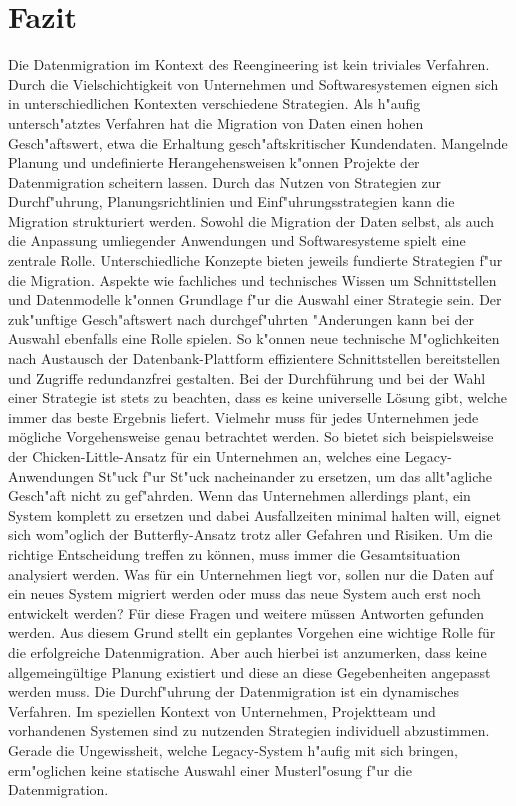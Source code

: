 \section{Fazit}
\label{chapter:fazit}

Die Datenmigration im Kontext des Reengineering ist kein triviales Verfahren. Durch die Vielschichtigkeit von Unternehmen und Softwaresystemen eignen sich in unterschiedlichen Kontexten verschiedene Strategien. Als h"aufig untersch"atztes Verfahren hat die Migration von Daten einen hohen Gesch"aftswert, etwa die Erhaltung gesch"aftskritischer Kundendaten. Mangelnde Planung und undefinierte Herangehensweisen k"onnen Projekte der Datenmigration scheitern lassen. Durch das Nutzen von Strategien zur Durchf"uhrung, Planungsrichtlinien und Einf"uhrungsstrategien kann die Migration strukturiert werden.
\lb
Sowohl die Migration der Daten selbst, als auch die Anpassung umliegender Anwendungen und Softwaresysteme spielt eine zentrale Rolle. Unterschiedliche Konzepte bieten jeweils fundierte Strategien f"ur die Migration. Aspekte wie fachliches und technisches Wissen um Schnittstellen und Datenmodelle k"onnen Grundlage f"ur die Auswahl einer Strategie sein. Der zuk"unftige Gesch"aftswert nach durchgef"uhrten "Anderungen kann bei der Auswahl ebenfalls eine Rolle spielen. So k"onnen neue technische M"oglichkeiten nach Austausch der Datenbank-Plattform effizientere Schnittstellen bereitstellen und Zugriffe redundanzfrei gestalten.
\lb
Bei der Durchführung und bei der Wahl einer Strategie ist stets zu beachten, dass es keine universelle Lösung gibt, welche immer das beste Ergebnis liefert. Vielmehr muss für jedes Unternehmen jede mögliche Vorgehensweise genau betrachtet werden. So bietet sich beispielsweise der Chicken-Little-Ansatz für ein Unternehmen an, welches eine Legacy-Anwendungen St"uck f"ur St"uck nacheinander zu ersetzen, um das allt"agliche Gesch"aft nicht zu gef"ahrden. Wenn das Unternehmen allerdings plant, ein System komplett zu ersetzen und dabei Ausfallzeiten minimal halten will, eignet sich wom"oglich der Butterfly-Ansatz trotz aller Gefahren und Risiken. 
\lb
Um die richtige Entscheidung treffen zu können, muss immer die Gesamtsituation analysiert werden. Was für ein Unternehmen liegt vor, sollen nur die Daten auf ein neues System migriert werden oder muss das neue System auch erst noch entwickelt werden? Für diese Fragen und weitere müssen Antworten gefunden werden. Aus diesem Grund stellt ein geplantes Vorgehen eine wichtige Rolle für die erfolgreiche Datenmigration. Aber auch hierbei ist anzumerken, dass keine allgemeingültige Planung existiert und diese an diese Gegebenheiten angepasst werden muss. 
\lb
Die Durchf"uhrung der Datenmigration ist ein dynamisches Verfahren. Im speziellen Kontext von Unternehmen, Projektteam und vorhandenen Systemen sind zu nutzenden Strategien individuell abzustimmen. Gerade die Ungewissheit, welche Legacy-System h"aufig mit sich bringen, erm"oglichen keine statische Auswahl einer Musterl"osung f"ur die Datenmigration.